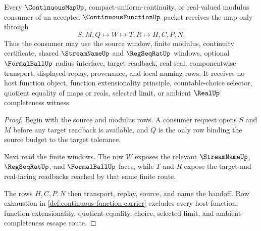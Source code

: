 \begin{theorem}
\label{thm:continuous-function-real-map-handoff}
Every $\ContinuousMapUp$, compact-uniform-continuity, or real-valued modulus consumer of an accepted $\ContinuousFunctionUp$ packet receives the map only through
$$
S,M,Q \longmapsto W \longmapsto T,R \longmapsto H,C,P,N .
$$
Thus the consumer may use the source window, finite modulus, continuity certificate, shared $\StreamNameUp$ and $\RegSeqRatUp$ windows, optional $\FormalBallUp$ radius interface, target readback, real seal, componentwise transport, displayed replay, provenance, and local naming rows. It receives no host function object, function extensionality principle, countable-choice selector, quotient equality of maps or reals, selected limit, or ambient $\RealUp$ completeness witness.
\end{theorem}
\begin{proof}
Begin with the source and modulus rows. A consumer request opens $S$ and $M$ before any target readback is available, and $Q$ is the only row binding the source budget to the target tolerance.

Next read the finite windows. The row $W$ exposes the relevant $\StreamNameUp$, $\RegSeqRatUp$, and $\FormalBallUp$ faces, while $T$ and $R$ expose the target and real-facing readbacks reached by that same finite route.

The rows $H,C,P,N$ then transport, replay, source, and name the handoff. Row exhaustion in \autoref{def:continuous-function-carrier} excludes every host-function, function-extensionality, quotient-equality, choice, selected-limit, and ambient-completeness escape route.
\end{proof}



